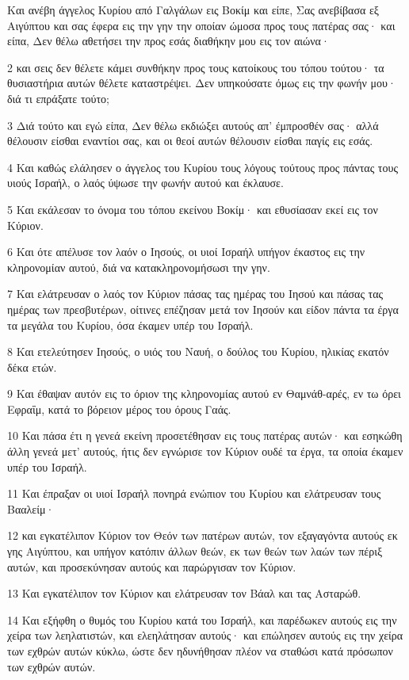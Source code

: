 \par Και ανέβη άγγελος Κυρίου από Γαλγάλων εις Βοκίμ και είπε, Σας ανεβίβασα εξ Αιγύπτου και σας έφερα εις την γην την οποίαν ώμοσα προς τους πατέρας σας· και είπα, Δεν θέλω αθετήσει την προς εσάς διαθήκην μου εις τον αιώνα·
\par 2 και σεις δεν θέλετε κάμει συνθήκην προς τους κατοίκους του τόπου τούτου· τα θυσιαστήρια αυτών θέλετε καταστρέψει. Δεν υπηκούσατε όμως εις την φωνήν μου· διά τι επράξατε τούτο;
\par 3 Διά τούτο και εγώ είπα, Δεν θέλω εκδιώξει αυτούς απ' έμπροσθέν σας· αλλά θέλουσιν είσθαι εναντίοι σας, και οι θεοί αυτών θέλουσιν είσθαι παγίς εις εσάς.
\par 4 Και καθώς ελάλησεν ο άγγελος του Κυρίου τους λόγους τούτους προς πάντας τους υιούς Ισραήλ, ο λαός ύψωσε την φωνήν αυτού και έκλαυσε.
\par 5 Και εκάλεσαν το όνομα του τόπου εκείνου Βοκίμ· και εθυσίασαν εκεί εις τον Κύριον.
\par 6 Και ότε απέλυσε τον λαόν ο Ιησούς, οι υιοί Ισραήλ υπήγον έκαστος εις την κληρονομίαν αυτού, διά να κατακληρονομήσωσι την γην.
\par 7 Και ελάτρευσαν ο λαός τον Κύριον πάσας τας ημέρας του Ιησού και πάσας τας ημέρας των πρεσβυτέρων, οίτινες επέζησαν μετά τον Ιησούν και είδον πάντα τα έργα τα μεγάλα του Κυρίου, όσα έκαμεν υπέρ του Ισραήλ.
\par 8 Και ετελεύτησεν Ιησούς, ο υιός του Ναυή, ο δούλος του Κυρίου, ηλικίας εκατόν δέκα ετών.
\par 9 Και έθαψαν αυτόν εις το όριον της κληρονομίας αυτού εν Θαμνάθ-αρές, εν τω όρει Εφραΐμ, κατά το βόρειον μέρος του όρους Γαάς.
\par 10 Και πάσα έτι η γενεά εκείνη προσετέθησαν εις τους πατέρας αυτών· και εσηκώθη άλλη γενεά μετ' αυτούς, ήτις δεν εγνώρισε τον Κύριον ουδέ τα έργα, τα οποία έκαμεν υπέρ του Ισραήλ.
\par 11 Και έπραξαν οι υιοί Ισραήλ πονηρά ενώπιον του Κυρίου και ελάτρευσαν τους Βααλείμ·
\par 12 και εγκατέλιπον Κύριον τον Θεόν των πατέρων αυτών, τον εξαγαγόντα αυτούς εκ γης Αιγύπτου, και υπήγον κατόπιν άλλων θεών, εκ των θεών των λαών των πέριξ αυτών, και προσεκύνησαν αυτούς και παρώργισαν τον Κύριον.
\par 13 Και εγκατέλιπον τον Κύριον και ελάτρευσαν τον Βάαλ και τας Ασταρώθ.
\par 14 Και εξήφθη ο θυμός του Κυρίου κατά του Ισραήλ, και παρέδωκεν αυτούς εις την χείρα των λεηλατιστών, και ελεηλάτησαν αυτούς· και επώλησεν αυτούς εις την χείρα των εχθρών αυτών κύκλω, ώστε δεν ηδυνήθησαν πλέον να σταθώσι κατά πρόσωπον των εχθρών αυτών.
